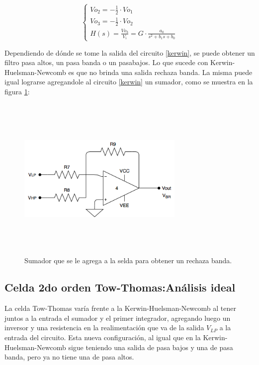 \begin{equation}
\begin{cases}
Vo_2 = -\frac{1}{2} \cdot Vo_1\\
Vo_3 = -\frac{1}{2} \cdot Vo_2\\
H(s) = \frac{Vo_3}{V_i} = G \cdot \frac{a_0}{s^2 + b_1 s + b_0}
\label{int2eq}
\end{cases}
\end{equation}


Dependiendo de d\'onde se tome la salida del circuito \ref{kerwin}, se puede obtener un filtro pasa altos, un pasa banda o un pasabajos. Lo que sucede con Kerwin-Huelsman-Newcomb es que no brinda una salida rechaza banda. La misma puede igual lograrse agregandole al circuito \ref{kerwin} un sumador, como se muestra en la figura \ref{sumador_extra}:

\begin{figure}[H] %
	\centering
	\includegraphics[width=8cm,height=8cm,keepaspectratio]{../EJ4/imagenes/sumador_extra.png}
	\caption{Sumador que se le agrega a la selda para obtener un rechaza banda.}
	\label{sumador_extra}
\end{figure}

\subsection{Celda 2do orden Tow-Thomas:An\'alisis ideal}

La celda Tow-Thomas var\'ia frente a la Kerwin-Huelsman-Newcomb al tener juntos a la entrada el sumador y el primer integrador, agregando luego un inversor y una resistencia en la realimentación que va de la salida $V_{LP}$ a la entrada del circuito. Esta nueva configuraci\'on, al igual que en la Kerwin-Huelsman-Newcomb sigue teniendo una salida de pasa bajos y una de pasa banda, pero ya no tiene una de pasa altos. 


